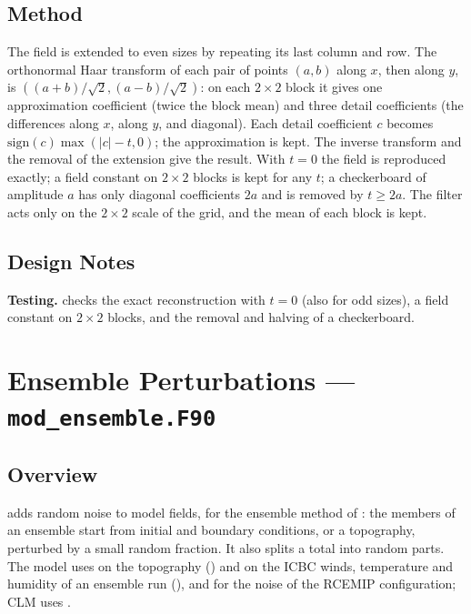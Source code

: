 \subsection{Method}

The field is extended to even sizes by repeating its last column and row.
The orthonormal Haar transform of each pair of points $(a,b)$ along $x$,
then along $y$, is $((a+b)/\sqrt2, (a-b)/\sqrt2)$: on each $2\times2$
block it gives one approximation coefficient (twice the block mean) and
three detail coefficients (the differences along $x$, along $y$, and
diagonal). Each detail coefficient $c$ becomes
$\mathrm{sign}(c)\max(|c|-t,0)$; the approximation is kept. The inverse
transform and the removal of the extension give the result. With $t=0$ the
field is reproduced exactly; a field constant on $2\times2$ blocks is kept
for any $t$; a checkerboard of amplitude $a$ has only diagonal coefficients
$2a$ and is removed by $t \geq 2a$. The filter acts only on the
$2\times2$ scale of the grid, and the mean of each block is kept.

\subsection{Design Notes}

\textbf{Testing.}  checks the exact
reconstruction with $t = 0$ (also for odd sizes), a field constant on
$2\times2$ blocks, and the removal and halving of a checkerboard.

\section{Ensemble Perturbations --- \texttt{mod\_ensemble.F90}}
\label{sec:ensemble}

\subsection{Overview}

 adds random noise to model fields, for the ensemble
method of \citet{obrien2011}: the members of an ensemble start from initial
and boundary conditions, or a topography, perturbed by a small random
fraction. It also splits a total into random parts. The model uses
 on the topography () and on the ICBC
winds, temperature and humidity of an ensemble run (),
and for the noise of the RCEMIP configuration; CLM uses
.

